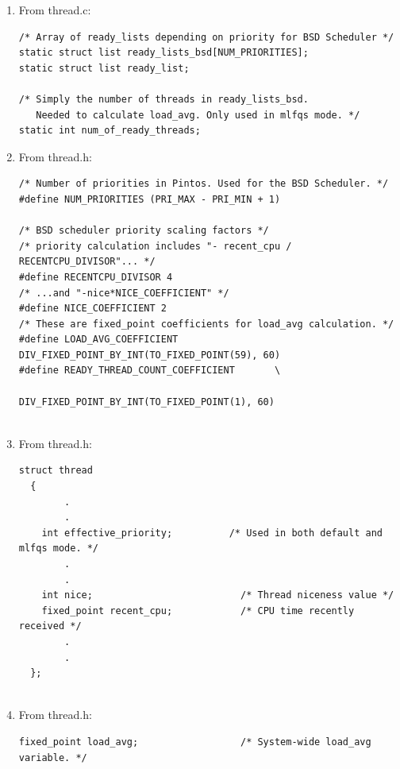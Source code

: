 \documentclass{article}
\renewcommand{\_}{\char`_}
\begin{document}
\begin{enumerate}

\item From thread.c: 
\begin{lstlisting}
/* Array of ready_lists depending on priority for BSD Scheduler */
static struct list ready_lists_bsd[NUM_PRIORITIES];
static struct list ready_list;

/* Simply the number of threads in ready_lists_bsd.
   Needed to calculate load_avg. Only used in mlfqs mode. */
static int num_of_ready_threads;

\end{lstlisting}


\item From thread.h:
\begin{lstlisting}
/* Number of priorities in Pintos. Used for the BSD Scheduler. */
#define NUM_PRIORITIES (PRI_MAX - PRI_MIN + 1)

/* BSD scheduler priority scaling factors */
/* priority calculation includes "- recent_cpu / RECENTCPU_DIVISOR"... */
#define RECENTCPU_DIVISOR 4
/* ...and "-nice*NICE_COEFFICIENT" */
#define NICE_COEFFICIENT 2
/* These are fixed_point coefficients for load_avg calculation. */
#define LOAD_AVG_COEFFICIENT DIV_FIXED_POINT_BY_INT(TO_FIXED_POINT(59), 60)
#define READY_THREAD_COUNT_COEFFICIENT       \
                              DIV_FIXED_POINT_BY_INT(TO_FIXED_POINT(1), 60)
                              
\end{lstlisting}
\newpage
\item From thread.h:
\begin{lstlisting}
struct thread
  {
        .
        .
    int effective_priority;          /* Used in both default and mlfqs mode. */
        .
        .
    int nice;                          /* Thread niceness value */
    fixed_point recent_cpu;            /* CPU time recently received */
        .
        .
  };
  
\end{lstlisting}

\item From thread.h:
\begin{lstlisting}
fixed_point load_avg;                  /* System-wide load_avg variable. */

\end{lstlisting}

\end{enumerate}
\end{document}
